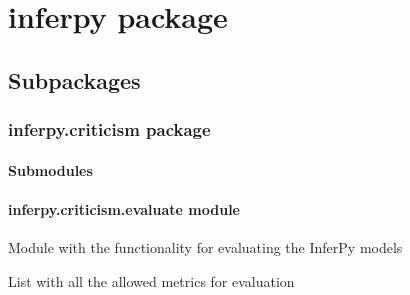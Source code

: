 \documentclass[letterpaper,10pt,english]{sphinxmanual}
\begin{document}
\chapter{inferpy package}
\label{\detokenize{modules/inferpy:inferpy-package}}\label{\detokenize{modules/inferpy::doc}}

\section{Subpackages}
\label{\detokenize{modules/inferpy:subpackages}}

\subsection{inferpy.criticism package}
\label{\detokenize{modules/inferpy.criticism::doc}}\label{\detokenize{modules/inferpy.criticism:inferpy-criticism-package}}

\subsubsection{Submodules}
\label{\detokenize{modules/inferpy.criticism:submodules}}

\subsubsection{inferpy.criticism.evaluate module}
\label{\detokenize{modules/inferpy.criticism:module-inferpy.criticism.evaluate}}\label{\detokenize{modules/inferpy.criticism:inferpy-criticism-evaluate-module}}
Module with the functionality for evaluating the InferPy models

\begin{fulllineitems}
\label{\detokenize{modules/inferpy.criticism:inferpy.criticism.evaluate.ALLOWED_METRICS}}
List with all the allowed metrics for evaluation

\end{fulllineitems}
\end{document}
